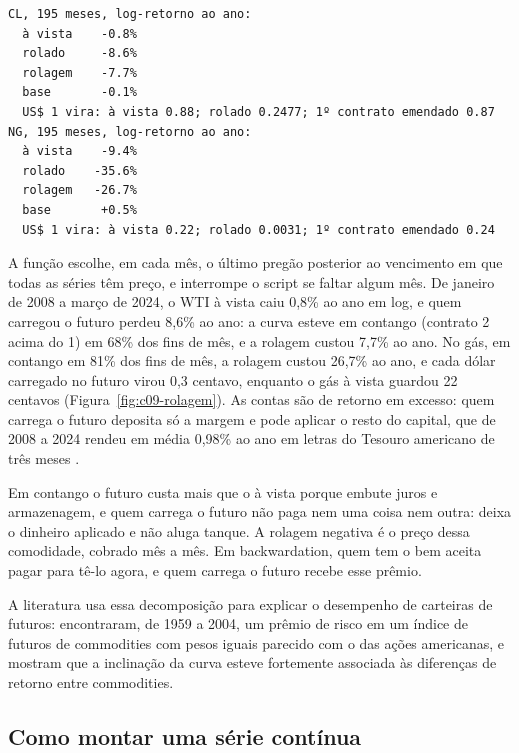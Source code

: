 
\begin{lstlisting}[style=saida]
CL, 195 meses, log-retorno ao ano:
  à vista    -0.8%
  rolado     -8.6%
  rolagem    -7.7%
  base       -0.1%
  US$ 1 vira: à vista 0.88; rolado 0.2477; 1º contrato emendado 0.87
NG, 195 meses, log-retorno ao ano:
  à vista    -9.4%
  rolado    -35.6%
  rolagem   -26.7%
  base       +0.5%
  US$ 1 vira: à vista 0.22; rolado 0.0031; 1º contrato emendado 0.24
\end{lstlisting}

A função  escolhe, em cada mês, o último pregão posterior ao vencimento em que todas as séries têm preço, e interrompe o script se faltar algum mês. De janeiro de 2008 a março de 2024, o WTI à vista caiu 0,8\% ao ano em log, e quem carregou o futuro perdeu 8,6\% ao ano: a curva esteve em contango (contrato 2 acima do 1) em 68\% dos fins de mês, e a rolagem custou 7,7\% ao ano. No gás, em contango em 81\% dos fins de mês, a rolagem custou 26,7\% ao ano, e cada dólar carregado no futuro virou 0,3 centavo, enquanto o gás à vista guardou 22 centavos (Figura~\ref{fig:c09-rolagem}). As contas são de retorno em excesso: quem carrega o futuro deposita só a margem e pode aplicar o resto do capital, que de 2008 a 2024 rendeu em média 0,98\% ao ano em letras do Tesouro americano de três meses \citep{fred2026}.

\begin{intuicao}
Em contango o futuro custa mais que o à vista porque embute juros e armazenagem, e quem carrega o futuro não paga nem uma coisa nem outra: deixa o dinheiro aplicado e não aluga tanque. A rolagem negativa é o preço dessa comodidade, cobrado mês a mês. Em backwardation, quem tem o bem aceita pagar para tê-lo agora, e quem carrega o futuro recebe esse prêmio.
\end{intuicao}

A literatura usa essa decomposição para explicar o desempenho de carteiras de futuros: \citet{gorton2006} encontraram, de 1959 a 2004, um prêmio de risco em um índice de futuros de commodities com pesos iguais parecido com o das ações americanas, e \citet{erb2006} mostram que a inclinação da curva esteve fortemente associada às diferenças de retorno entre commodities.

\subsection{Como montar uma série contínua}

